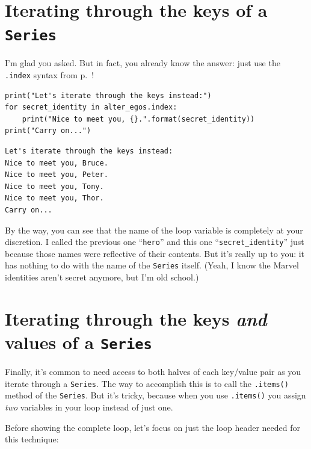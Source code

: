 \section{Iterating through the keys of a \texttt{Series}}


I'm glad you asked. But in fact, you already know the answer: just use the
\texttt{.index} syntax from p.~\pageref{dotIndex}!

\begin{Verbatim}[fontsize=\small,samepage=true,frame=single,framesep=3mm]
print("Let's iterate through the keys instead:")
for secret_identity in alter_egos.index:
    print("Nice to meet you, {}.".format(secret_identity))
print("Carry on...")
\end{Verbatim}

\begin{Verbatim}[fontsize=\small,samepage=true,frame=leftline,framesep=5mm,framerule=1mm]
Let's iterate through the keys instead:
Nice to meet you, Bruce.
Nice to meet you, Peter.
Nice to meet you, Tony.
Nice to meet you, Thor.
Carry on...
\end{Verbatim}


By the way, you can see that the name of the loop variable is completely at
your discretion. I called the previous one ``\texttt{hero}'' and this one
``\texttt{secret\_identity}'' just because those names were reflective of their
contents. But it's really up to you: it has nothing to do with the name of the
\texttt{Series} itself. (Yeah, I know the Marvel identities aren't secret
anymore, but I'm old school.)

\section{Iterating through the keys \textit{and} values of a \texttt{Series}}


Finally, it's common to need access to both halves of each key/value pair as
you iterate through a \texttt{Series}. The way to accomplish this is to call
the \texttt{.items()} method of the \texttt{Series}. But it's tricky, because
when you use \texttt{.items()} you assign \textit{two} variables in your loop
instead of just one.

Before showing the complete loop, let's focus on just the loop header needed
for this technique:

